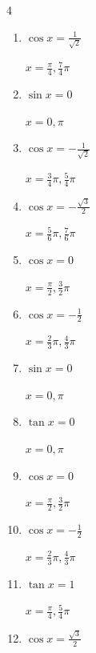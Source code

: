 \begin{multicols}{4}
\begin{enumerate}
  \item $\displaystyle \cos{x}  = \frac{1}{\sqrt{2}}$

        $\displaystyle x = \frac{\pi}{4} , \frac{7}{4}\pi$

  \item $\displaystyle \sin{x}  = 0$

        $\displaystyle x = 0 , \pi$

  \item $\displaystyle \cos{x}  = -\frac{1}{\sqrt{2}}$

        $\displaystyle x = \frac{3}{4}\pi , \frac{5}{4}\pi$

  \item $\displaystyle \cos{x}  = -\frac{\sqrt{3}}{2}$

        $\displaystyle x = \frac{5}{6}\pi , \frac{7}{6}\pi$

  \item $\displaystyle \cos{x}  = 0$

        $\displaystyle x = \frac{\pi}{2} , \frac{3}{2}\pi$

  \item $\displaystyle \cos{x}  = -\frac{1}{2}$

        $\displaystyle x = \frac{2}{3}\pi , \frac{4}{3}\pi$

  \item $\displaystyle \sin{x}  = 0$

        $\displaystyle x = 0 , \pi$

  \item $\displaystyle \tan{x}  = 0$

        $\displaystyle x = 0 , \pi$

  \item $\displaystyle \cos{x}  = 0$

        $\displaystyle x = \frac{\pi}{2} , \frac{3}{2}\pi$

\columnbreak %

\resetques

  \item $\displaystyle \cos{x}  = -\frac{1}{2}$

        $\displaystyle x = \frac{2}{3}\pi , \frac{4}{3}\pi$

  \item $\displaystyle \tan{x}  = 1$

        $\displaystyle x = \frac{\pi}{4} , \frac{5}{4}\pi$

  \item $\displaystyle \cos{x}  = \frac{\sqrt{3}}{2}$


\end{enumerate}
\end{multicols}
